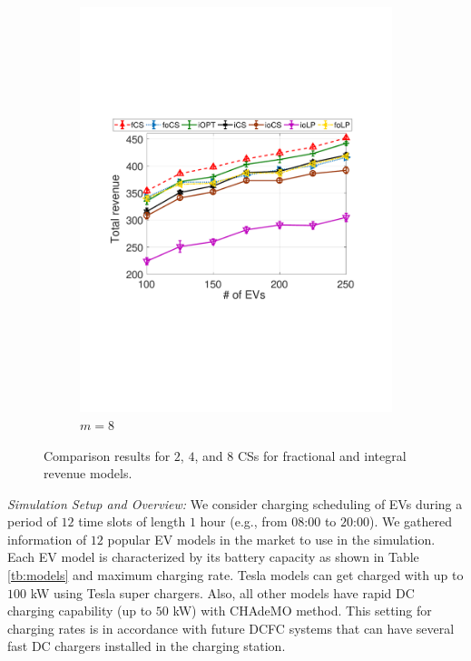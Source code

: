 \documentclass[journal]{IEEEtran}
\newcommand{\revv}[1]{{\color{black}#1}}%
\begin{document}
\begin{figure}[t]
\begin{subfigure}[b]{0.25\textwidth}
\begin{center}
						\includegraphics[width=\textwidth]{V-N-M8.pdf}
						\caption{\revv{$m=8$}}
						\label{fig:V-N-M8}
					\end{center}
				\end{subfigure}%
				\caption{\revv{Comparison results for $2$, $4$, and $8$ CSs for fractional and integral revenue models.}} 
				\label{fig:V-N-M}
				\vspace{-3mm}
			\end{figure}
\textit{Simulation Setup and Overview:} We consider charging scheduling of EVs \revv{during a period of $12$ time slots of length $1$ hour (e.g., from $08$:$00$ to $20$:$00$)}. 
We gathered information of \revv{$12$} popular EV models in the market to use in the simulation. Each EV model is characterized by its battery capacity as shown in Table \ref{tb:models} and maximum charging rate. \revv{Tesla models can get charged with up to $100$ kW using Tesla super chargers. Also, all other models have rapid DC charging capability (up to $50$ kW) with CHAdeMO method. This setting for charging rates is in accordance with future DCFC systems that can have several fast DC chargers installed in the charging station.} 
\end{document}
